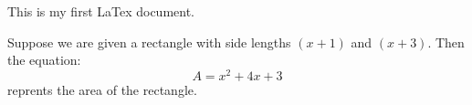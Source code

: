 \documentclass[11pt]{article}
\begin{document}
This is my first LaTex document.

Suppose we are given a rectangle with side lengths $(x+1)$ and $(x+3)$. Then the equation: $$A=x^2+4x+3$$ reprents the area of the rectangle.
\end{document}
